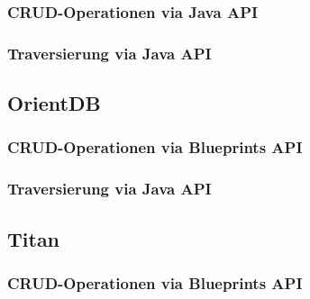 \subsubsection{CRUD-Operationen via Java API}

\subsubsection{Traversierung via Java API}

\subsection{OrientDB}

\subsubsection{CRUD-Operationen via Blueprints API}
\label{anh:orientdb_blueprints_api}

\subsubsection{Traversierung via Java API}
\label{anh:orientdb_traverse_java}

\subsection*{Titan}

\subsubsection{CRUD-Operationen via Blueprints API}
\label{anh:titan_blueprints_api}

